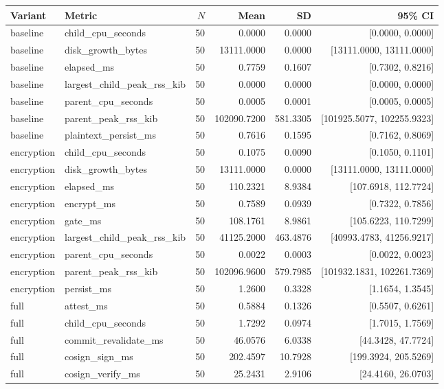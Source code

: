 \begin{tabular}{llrrrr}
Variant & Metric & $N$ & Mean & SD & 95\% CI \\
\hline
baseline & child\_cpu\_seconds & 50 & 0.0000 & 0.0000 & [0.0000, 0.0000] \\
baseline & disk\_growth\_bytes & 50 & 13111.0000 & 0.0000 & [13111.0000, 13111.0000] \\
baseline & elapsed\_ms & 50 & 0.7759 & 0.1607 & [0.7302, 0.8216] \\
baseline & largest\_child\_peak\_rss\_kib & 50 & 0.0000 & 0.0000 & [0.0000, 0.0000] \\
baseline & parent\_cpu\_seconds & 50 & 0.0005 & 0.0001 & [0.0005, 0.0005] \\
baseline & parent\_peak\_rss\_kib & 50 & 102090.7200 & 581.3305 & [101925.5077, 102255.9323] \\
baseline & plaintext\_persist\_ms & 50 & 0.7616 & 0.1595 & [0.7162, 0.8069] \\
encryption & child\_cpu\_seconds & 50 & 0.1075 & 0.0090 & [0.1050, 0.1101] \\
encryption & disk\_growth\_bytes & 50 & 13111.0000 & 0.0000 & [13111.0000, 13111.0000] \\
encryption & elapsed\_ms & 50 & 110.2321 & 8.9384 & [107.6918, 112.7724] \\
encryption & encrypt\_ms & 50 & 0.7589 & 0.0939 & [0.7322, 0.7856] \\
encryption & gate\_ms & 50 & 108.1761 & 8.9861 & [105.6223, 110.7299] \\
encryption & largest\_child\_peak\_rss\_kib & 50 & 41125.2000 & 463.4876 & [40993.4783, 41256.9217] \\
encryption & parent\_cpu\_seconds & 50 & 0.0022 & 0.0003 & [0.0022, 0.0023] \\
encryption & parent\_peak\_rss\_kib & 50 & 102096.9600 & 579.7985 & [101932.1831, 102261.7369] \\
encryption & persist\_ms & 50 & 1.2600 & 0.3328 & [1.1654, 1.3545] \\
full & attest\_ms & 50 & 0.5884 & 0.1326 & [0.5507, 0.6261] \\
full & child\_cpu\_seconds & 50 & 1.7292 & 0.0974 & [1.7015, 1.7569] \\
full & commit\_revalidate\_ms & 50 & 46.0576 & 6.0338 & [44.3428, 47.7724] \\
full & cosign\_sign\_ms & 50 & 202.4597 & 10.7928 & [199.3924, 205.5269] \\
full & cosign\_verify\_ms & 50 & 25.2431 & 2.9106 & [24.4160, 26.0703] \\

\end{tabular}

